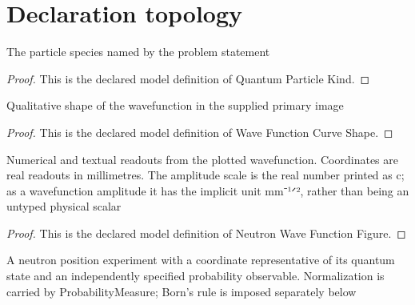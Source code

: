 \section{Declaration topology}
\begin{definition}
  \label{def:physics:phyx-mini-0648:phyxminiproblems-problemphyxmini0648-quantumparticlekind}
  The particle species named by the problem statement
\end{definition}
\begin{proof}
  This is the declared model definition of Quantum Particle Kind.
\end{proof}
\begin{definition}
  \label{def:physics:phyx-mini-0648:phyxminiproblems-problemphyxmini0648-wavefunctioncurveshape}
  Qualitative shape of the wavefunction in the supplied primary image
\end{definition}
\begin{proof}
  This is the declared model definition of Wave Function Curve Shape.
\end{proof}
\begin{definition}
  \label{def:physics:phyx-mini-0648:phyxminiproblems-problemphyxmini0648-neutronwavefunctionfigure}
  Numerical and textual readouts from the plotted wavefunction. Coordinates are real readouts in millimetres. The amplitude scale is the real number printed as c; as a wavefunction amplitude it has the implicit unit mm⁻¹ᐟ², rather than being an untyped physical scalar
\end{definition}
\begin{proof}
  This is the declared model definition of Neutron Wave Function Figure.
\end{proof}
\begin{definition}
  \label{def:physics:phyx-mini-0648:phyxminiproblems-problemphyxmini0648-neutronpositionexperiment}
  A neutron position experiment with a coordinate representative of its quantum state and an independently specified probability observable. Normalization is carried by ProbabilityMeasure; Born's rule is imposed separately below
\end{definition}
